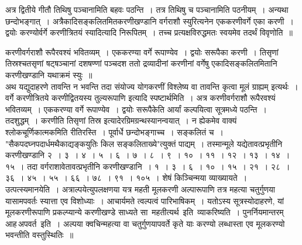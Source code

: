 \documentclass[11pt, openany]{book}
\begin{document}
अत्र द्वितीये गीतौ तिथिषु पञ्चानामिति बहवः पठन्ति~। तत्र तिथिषु 
च पञ्चानामिति पठनीयम्~। अन्यथा छन्दोभङ्गात्~। अत्रैकादिसङ्कलितमितकरणीखण्डानि वर्गराशौ स्युरित्यनेन एककरणीवर्गे एका करणी~। द्वयोः 
करण्योर्वर्गे करणीत्रितयं स्यादित्यादि निरूपितम्~। तच्च
प्रत्यक्षविरुद्धमतः 
स्वयमेव तदर्थं विवृणोति~॥
\newpage

 करणीवर्गराशौ रूपैरवश्यं भवितव्यम्~। एककरण्या वर्गे रूपाण्येव~। 
द्वयोः सरूपैका करणी~। तिसृणां तिस्रश्चतसृणां षट्षञ्चानां दशषण्णां पञ्चदश
ततो द्रव्यादीनां करणीनां वर्गेषु एकादिसङ्कलितमितानि करणीखण्डानि 
यथाक्रमं स्युः~॥ \\

\vspace{-3mm}
 अथ यद्युदाहरणे तावन्ति न भवन्ति तदा संयोज्य योगकरणीं 
विश्लेष्य वा तावन्ति कृत्वा मूलं ग्राह्यम् इत्यर्थः~। वर्गे करणीत्रितये
करणीद्वितयस्य तुल्यरूपाणि इत्यादि स्पष्टार्थमिति~। अत्र करणीवर्गराशौ 
रूपैरवश्यं भवितव्यम्~। एककरण्या वर्गे रूपाण्येव~। द्वयोः सरूपैकेति 
आर्यां कल्पयित्वा सूत्रमध्ये पठन्ति~। तदशुद्धम्~। करणीति तिसृणां 
तिस्र इत्यादेरग्रिमग्रन्थस्यानन्वयात्~। न ह्येकमेव वाक्यं
श्लोकचूर्णिकात्मकमिति रीतिरस्ति~। पूर्वार्धे छन्दोभङ्गाच्च~। सङ्कलितं च~। {\qt "सैकपदघ्नपदार्धमथैकाद्यङ्कयुतिः किल सङ्कलिताख्ये"}त्युक्तं पाद्यम्~। तस्मान्मूले
यद्येतावत्प्रभृतीनि करणीखण्डानि २~। ३~। ४~। ५~। ६~। ७~। ८~। ९~। १०~। ११~। १२~। १३~। १४~। १५~। तदा वर्गराशावेतावत्प्रभृतीनि करणीखण्डानि~। 
१~। ३~। ६~। १०~। १५~। २१~। २८~। ३६~। ४५~। ५५~। ६६~। 
७८~। ९१~। १०५~। शेषं किञ्चिन्मया व्याख्यायते~। \\

\vspace{-3mm}
 उत्पत्स्यमानयेति~। अत्राल्पयेत्युपलक्षणया यत्र महती मूलकरणी अल्पारूपाणि तत्र महत्या चतुर्गुणया यासामपवर्तः स्यात्ता एव विशोध्याः~। आचार्यमते त्वल्पत्वं पारिभाषिकम्~। यतोऽस्य सूत्रस्योदाहरणे, यां मूलकरणीरूपाणि प्रकल्प्यान्ये करणीखण्डे साध्यते सा \,महतीत्यर्थ \,इति \,व्याकरिष्यति~। पुनर्नियमान्तरम् \,आह\textendash \,अपवर्त \,इति~। अल्पया क्वचिन्महत्या वा चतुर्गुणयापवर्ते कृते याः करण्यो लब्धास्ता एव मूलकरण्यो भवन्तीति वस्तुस्थितिः~॥ \\
\end{document}
